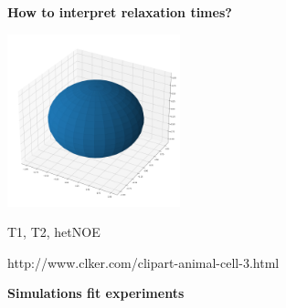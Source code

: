 \begin{frame}
\LARGE{\centering
\textbf{How to interpret relaxation times?} \\
\begin{center}
 \includegraphics[height=5cm]{kolo.png}
\end{center}
T1, T2, hetNOE\\
}
{\tiny http://www.clker.com/clipart-animal-cell-3.html }
\end{frame}
















\begin{frame}
\LARGE{\centering
\textbf{Simulations fit experiments}}
\end{frame}




